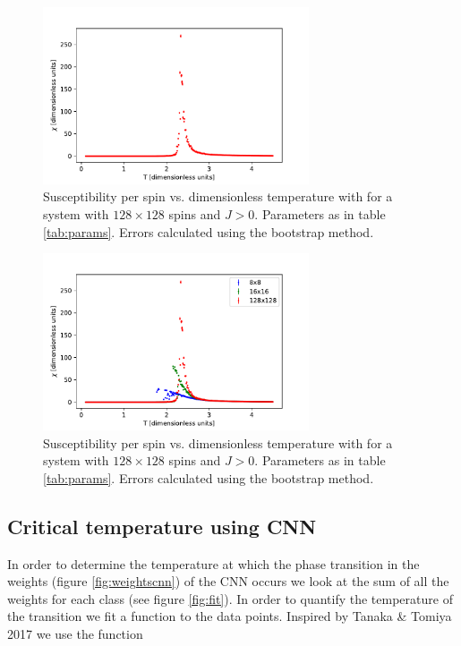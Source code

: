 \documentclass[10 pt, a4paper]{article}
\begin{document}
\begin{figure}[H]
\centering
\includegraphics[width=0.7\textwidth]{chi128}
\caption{Susceptibility per spin vs. dimensionless temperature with for a system with $128 \times 128$ spins and $J > 0$. Parameters as in table \ref{tab:params}. Errors calculated using the bootstrap method. \label{fig:chi128}}
\end{figure}

\begin{figure}[H]
\centering
\includegraphics[width=0.7\textwidth]{chi}
\caption{Susceptibility per spin vs. dimensionless temperature with for a system with $128 \times 128$ spins and $J > 0$. Parameters as in table \ref{tab:params}. Errors calculated using the bootstrap method. \label{fig:chi}}
\end{figure}

\subsection{Critical temperature using CNN}

In order to determine the temperature at which the phase transition in the weights (figure \ref{fig:weightscnn}) of the CNN occurs  we look at the sum of all the weights for each class (see figure \ref{fig:fit}). In order to quantify the temperature of the transition we fit a function to the data points. Inspired by Tanaka \& Tomiya 2017 \cite{phasemethod} we use the function
\end{document}
